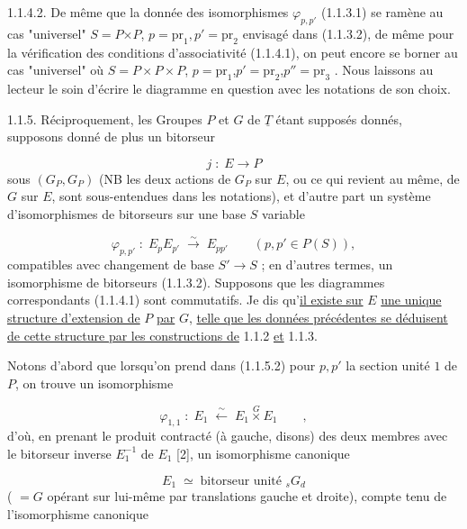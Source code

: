 1.1.4.2.  De même que la donnée des isomorphismes $\varphi_{p,p'}$ (1.1.3.1) se ramène au cas "universel" $S=P$$\times$$P$, $p=\mathrm{pr}_1,p' = \mathrm{pr}_2$ envisagé dans (1.1.3.2), de même
pour la vérification des conditions d'associativité (1.1.4.1), on peut encore se borner au cas "universel" où $S=P\times P\times P$, $p=\mathrm{pr}_1$,$p'=\mathrm{pr}_2$,$p''=\mathrm{pr}_3$ . Nous laissons au lecteur le soin d'écrire le diagramme en question avec les notations de son choix.

1.1.5.  Réciproquement, les Groupes $P$ et $G$ de $\underline{T}$ étant supposés donnés, supposons donné de plus un bitorseur

\begin{equation}\tag{1.1.5.1}
j \; : \; E \longrightarrow P
\end{equation}
sous $(G_{P},G_{P})$ (NB les deux actions de $G_{P}$ sur $E$, ou ce qui revient au même, de $G$ sur $E$, sont sous-entendues dans les notations), et d'autre part un système d'isomorphismes de bitorseurs sur une base $S$ variable

\begin{equation}\tag{1.1.5.2}
\varphi_{p,p'} \; : \; E_{p}E_{p'} \;\overset{\sim}{\longrightarrow}\; E_{pp'} \qquad (p,p' \in P(S)),
\end{equation}
compatibles avec changement de base $S' \longrightarrow S$ ; en d'autres termes, un isomorphisme de bitorseurs (1.1.3.2). Supposons que les diagrammes correspondants (1.1.4.1) sont commutatifs. Je dis qu'\underline{il existe sur} $E$ \underline{une unique structure d'extension de} $P$ \underline{par} $G$, \underline{telle que les données précédentes se déduisent de cette structure par les constructions de} 1.1.2 \underline{et} 1.1.3.

Notons d'abord que lorsqu'on prend dans (1.1.5.2) pour $p,p'$ la section unité $1$ de $P$, on trouve un isomorphisme

\begin{equation}\tag{1.1.5.3}
\varphi_{1,1} \; : \; E_{1} \;\overset{\sim}{\longleftarrow}\; E_{1} \overset{G}{\times} E_{1} \qquad ,
\end{equation}
d'où, en prenant le produit contracté (à gauche, disons) des deux membres avec le bitorseur inverse $E_{1}^{-1}$ de $E_{1}$ [2], un isomorphisme canonique

\begin{equation}\tag{1.1.5.4}
E_{1} \;\simeq\; \text{bitorseur unité } {}_{s}G_{d}
\end{equation}
( $= G$ opérant sur lui-même par translations gauche et droite), compte tenu
de l'isomorphisme canonique

